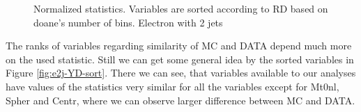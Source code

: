 \begin{figure}[h]
\quad
    \caption{Normalized statistics. Variables are sorted according to RD based on doane's number of bins. Electron with 2 jets}
    \label{fig:e2j-statsSort}
\end{figure}

The ranks of variables regarding similarity of MC and DATA depend much more on the used statistic. Still we can get some general idea by the  sorted variables in Figure  \ref{fig:e2j-YD-sort}. There we can see, that variables available to our analyses have values of the statistics very similar for all the variables except for \textsf{Mt0nl, Spher} and \textsf{Centr}, where we can observe larger difference between MC and DATA. 


